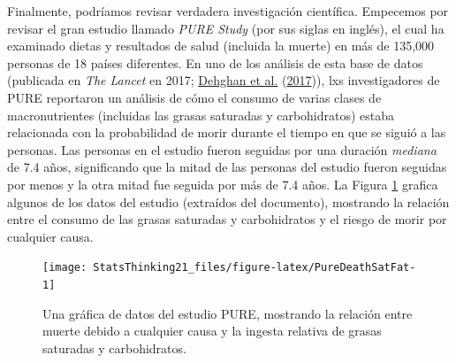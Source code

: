 \documentclass[
  12pt,
]{book}
\begin{document}
Finalmente, podríamos revisar verdadera investigación científica. Empecemos por revisar el gran estudio llamado \emph{PURE Study} (por sus siglas en inglés), el cual ha examinado dietas y resultados de salud (incluida la muerte) en más de 135,000 personas de 18 países diferentes. En uno de los análisis de esta base de datos (publicada en \emph{The Lancet} en 2017; \protect\hyperlink{ref-dehg:ment:zhan:2017}{Dehghan et al.} (\protect\hyperlink{ref-dehg:ment:zhan:2017}{2017})), lxs investigadores de PURE reportaron un análisis de cómo el consumo de varias clases de macronutrientes (incluidas las grasas saturadas y carbohidratos) estaba relacionada con la probabilidad de morir durante el tiempo en que se siguió a las personas. Las personas en el estudio fueron seguidas por una duración \emph{mediana} de 7.4 años, significando que la mitad de las personas del estudio fueron seguidas por menos y la otra mitad fue seguida por más de 7.4 años. La Figura \ref{fig:PureDeathSatFat} grafica algunos de los datos del estudio (extraídos del documento), mostrando la relación entre el consumo de las grasas saturadas y carbohidratos y el riesgo de morir por cualquier causa.

\begin{figure}
\texttt{[image: StatsThinking21\_files/figure-latex/PureDeathSatFat-1]} \caption{Una gráfica de datos del estudio PURE, mostrando la relación entre muerte debido a cualquier causa y la ingesta relativa de grasas saturadas y carbohidratos.}\label{fig:PureDeathSatFat}
\end{figure}
\end{document}

